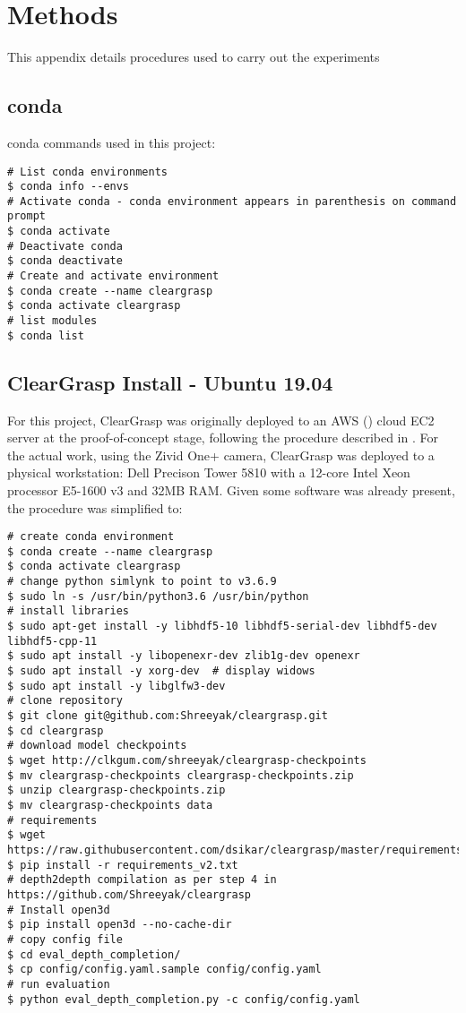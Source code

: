 \chapter{Methods} %
\label{Appendix-methods} 

This appendix details procedures used to carry out the experiments

\section{conda}
\label{app_methods:conda}

conda commands used in this project:

\begin{verbatim}
# List conda environments
$ conda info --envs
# Activate conda - conda environment appears in parenthesis on command prompt
$ conda activate
# Deactivate conda
$ conda deactivate
# Create and activate environment
$ conda create --name cleargrasp
$ conda activate cleargrasp
# list modules
$ conda list
\end{verbatim}

\section{ClearGrasp Install - Ubuntu 19.04}

For this project, ClearGrasp was originally deployed to an AWS (\cite{amazon2015amazon}) cloud EC2 server at the proof-of-concept stage, following the procedure described in \cite{cleargrasp-install2020}. For the actual work, using the Zivid One+ camera, ClearGrasp was deployed to a physical workstation: Dell Precison Tower 5810 with a 12-core Intel Xeon processor E5-1600 v3 and 32MB RAM. Given some software was already present, the procedure was simplified to:
\begin{verbatim}
# create conda environment
$ conda create --name cleargrasp
$ conda activate cleargrasp
# change python simlynk to point to v3.6.9
$ sudo ln -s /usr/bin/python3.6 /usr/bin/python
# install libraries
$ sudo apt-get install -y libhdf5-10 libhdf5-serial-dev libhdf5-dev libhdf5-cpp-11
$ sudo apt install -y libopenexr-dev zlib1g-dev openexr
$ sudo apt install -y xorg-dev  # display widows
$ sudo apt install -y libglfw3-dev
# clone repository
$ git clone git@github.com:Shreeyak/cleargrasp.git
$ cd cleargrasp
# download model checkpoints
$ wget http://clkgum.com/shreeyak/cleargrasp-checkpoints 
$ mv cleargrasp-checkpoints cleargrasp-checkpoints.zip
$ unzip cleargrasp-checkpoints.zip
$ mv cleargrasp-checkpoints data
# requirements
$ wget https://raw.githubusercontent.com/dsikar/cleargrasp/master/requirements_v2.txt
$ pip install -r requirements_v2.txt
# depth2depth compilation as per step 4 in https://github.com/Shreeyak/cleargrasp
# Install open3d
$ pip install open3d --no-cache-dir
# copy config file
$ cd eval_depth_completion/
$ cp config/config.yaml.sample config/config.yaml
# run evaluation
$ python eval_depth_completion.py -c config/config.yaml
\end{verbatim}

